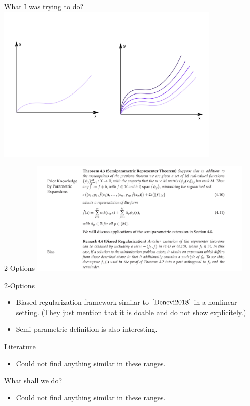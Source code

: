 \documentclass[aspectratio=169]{beamer}
\begin{document}
\begin{frame}{What I was trying to do?}
  \centering
    \includegraphics[width=0.8\textwidth]{singlevsmeta}
\end{frame}

\begin{frame}{2-Options\cite{Scholkopf2002}}
  \centering
    \includegraphics[width=0.8\textwidth]{options}
\end{frame}

\begin{frame}{2-Options\cite{Scholkopf2002}}
  \begin{itemize}
    \item Biased regularization framework similar to $\cite{Denevi2018}$ in a nonlinear setting. (They just mention that it is doable and do not show explicitely.)
    \item Semi-parametric definition is also interesting. 
  \end{itemize}
\end{frame}

\begin{frame}{Literature}
  \begin{itemize}
    \item Could not find anything similar in these ranges.
  \end{itemize}
\end{frame}

\begin{frame}{What shall we do?}
  \begin{itemize}
    \item Could not find anything similar in these ranges.
  \end{itemize}
\end{frame}
\end{document}
